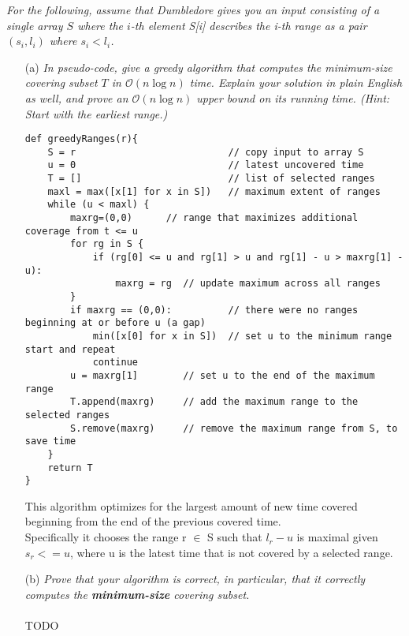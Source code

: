 \documentclass[12pt]{article}
\begin{document}
\textit{For the following, assume that Dumbledore gives you an input consisting of a single
array $S$ where the $i$-th element S[i] describes the i-th range as a pair $(s_i, l_i)$ where $s_i < l_i$.}

\pagebreak 
\begin{enumerate}
\item[(a)]\textit{In pseudo-code, give a greedy algorithm that computes the minimum-size covering
subset $T$ in $\mathcal{O}(n \log n)$ time. Explain your solution in plain English as well, and
prove an $\mathcal{O}(n \log n)$ upper bound on its running time. (Hint: Start with the earliest
range.)}
\\
\begin{verbatim}
def greedyRanges(r){
    S = r                           // copy input to array S
    u = 0                           // latest uncovered time
    T = []                          // list of selected ranges
    maxl = max([x[1] for x in S])   // maximum extent of ranges
    while (u < maxl) {  
        maxrg=(0,0)      // range that maximizes additional coverage from t <= u
        for rg in S {
            if (rg[0] <= u and rg[1] > u and rg[1] - u > maxrg[1] - u):
                maxrg = rg  // update maximum across all ranges
        }
        if maxrg == (0,0):          // there were no ranges beginning at or before u (a gap)
            min([x[0] for x in S])  // set u to the minimum range start and repeat 
            continue
        u = maxrg[1]        // set u to the end of the maximum range
        T.append(maxrg)     // add the maximum range to the selected ranges
        S.remove(maxrg)     // remove the maximum range from S, to save time
    }
    return T
}
\end{verbatim}

This algorithm optimizes for the largest amount of new time covered beginning from the end of the previous covered time. \\
Specifically it chooses the range r $\in$ S such that $l_r - u$ is maximal given $s_r <= u$, where u is the latest time that is not covered by a selected range. 



\item[(b)]\textit{Prove that your algorithm is correct, in particular, that it correctly computes the \textbf{minimum-size} covering subset.}
\\\\
TODO
\\

\end{enumerate}
\end{document}
